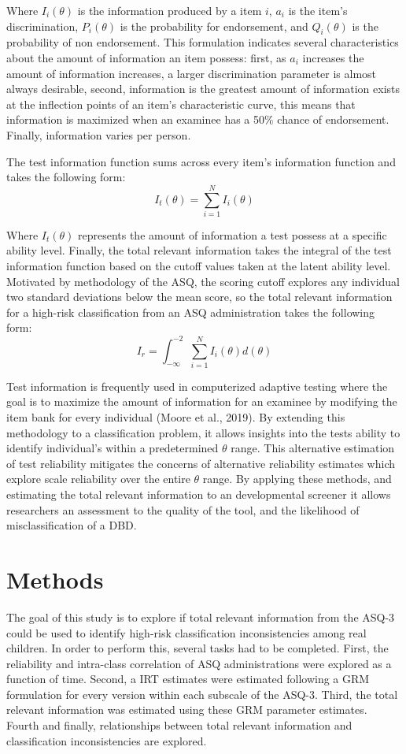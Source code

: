 \documentclass[
  11pt,
]{article}
\begin{document}
Where \(I_i(\theta)\) is the information produced by a item \(i\),
\(a_i\) is the item's discrimination, \(P_i(\theta)\) is the probability
for endorsement, and \(Q_i(\theta)\) is the probability of non
endorsement. This formulation indicates several characteristics about
the amount of information an item possess: first, as \(a_i\) increases
the amount of information increases, a larger discrimination parameter
is almost always desirable, second, information is the greatest amount
of information exists at the inflection points of an item's
characteristic curve, this means that information is maximized when an
examinee has a 50\% chance of endorsement. Finally, information varies
per person.

The test information function sums across every item's information
function and takes the following form:
\[I_t(\theta)=\sum_{i=1}^NI_i(\theta)\]

Where \(I_t(\theta)\) represents the amount of information a test
possess at a specific ability level. Finally, the total relevant
information takes the integral of the test information function based on
the cutoff values taken at the latent ability level. Motivated by
methodology of the ASQ, the scoring cutoff explores any individual two
standard deviations below the mean score, so the total relevant
information for a high-risk classification from an ASQ administration
takes the following form:
\[I_r=\int_{-\infty}^{-2}\sum_{i=1}^NI_i(\theta)d(\theta)\]

Test information is frequently used in computerized adaptive testing
where the goal is to maximize the amount of information for an examinee
by modifying the item bank for every individual (Moore et al., 2019). By
extending this methodology to a classification problem, it allows
insights into the tests ability to identify individual's within a
predetermined \(\theta\) range. This alternative estimation of test
reliability mitigates the concerns of alternative reliability estimates
which explore scale reliability over the entire \(\theta\) range. By
applying these methods, and estimating the total relevant information to
an developmental screener it allows researchers an assessment to the
quality of the tool, and the likelihood of misclassification of a DBD.

\hypertarget{methods}{%
\section{Methods}\label{methods}}

The goal of this study is to explore if total relevant information from
the ASQ-3 could be used to identify high-risk classification
inconsistencies among real children. In order to perform this, several
tasks had to be completed. First, the reliability and intra-class
correlation of ASQ administrations were explored as a function of time.
Second, a IRT estimates were estimated following a GRM formulation for
every version within each subscale of the ASQ-3. Third, the total
relevant information was estimated using these GRM parameter estimates.
Fourth and finally, relationships between total relevant information and
classification inconsistencies are explored.
\end{document}
